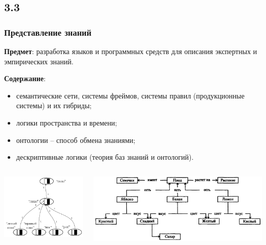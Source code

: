 \documentclass[default]{beamer}
\begin{document}
	\subsection{3.3}
	\begin{frame}
		\frametitle{Представление знаний}
		
		\textbf{Предмет}:  разработка языков и программных средств   для описания экспертных и эмпирических знаний. 
		\par\medskip
		\textbf{Содержание}:
		\begin{itemize}
			\item семантические сети, системы фреймов, системы правил (продукционные системы) и их гибриды;
			\item логики пространства и времени;
			\item онтологии – способ обмена знаниями;
			\item дескриптивные логики (теория баз знаний и онтологий).
		\end{itemize}
		\begin{columns}
			\begin{column}{0.45\textwidth}
				\includegraphics[width=\textwidth,page=3]{examples/causnet/caus_net}
			\end{column}
			\begin{column}{0.45\textwidth}
				\includegraphics[width=\textwidth]{misc/presentations/semnet1.png}
			\end{column}
		\end{columns}	
	\end{frame}
\end{document}
